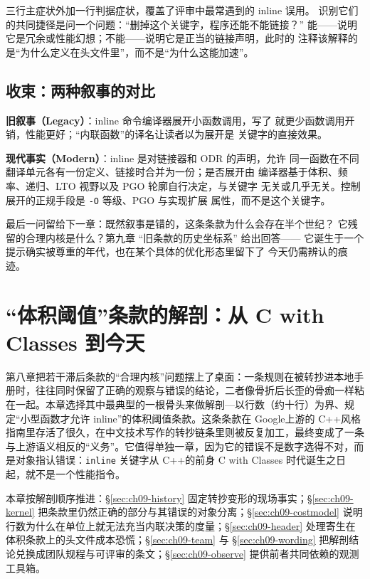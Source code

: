 \documentclass[12pt,a4paper,fontset=fandol]{ctexbook}
\newcommand{\Tp}[1]{\texttt{#1}}
\newcommand{\Lang}[1]{\textsf{#1}}
\newcommand{\CPP}{\Lang{C++}}
\newcommand{\DomGo}{\Lang{Google}}
\newcommand{\DomMod}{\Lang{Modern}}
\newcommand{\DomTra}{\Lang{Legacy}}
\begin{document}
三行主症状外加一行判据症状，覆盖了评审中最常遇到的 inline 误用。
识别它们的共同捷径是问一个问题：``删掉这个关键字，程序还能不能链接？''
能——说明它是冗余或性能幻想；不能——说明它是正当的链接声明，此时的
注释该解释的是``为什么定义在头文件里''，而不是``为什么这能加速''。

\section{收束：两种叙事的对比}
\label{sec:ch08-close}

\begin{compare}[title={``inline 是优化指令''与``inline 是链接语义标记''}]
\textbf{旧叙事（\DomTra）}：inline 命令编译器展开小函数调用，写了
就更少函数调用开销，性能更好；``内联函数''的译名让读者以为展开是
关键字的直接效果。

\textbf{现代事实（\DomMod）}：inline 是对链接器和 ODR 的声明，允许
同一函数在不同翻译单元各有一份定义、链接时合并为一份；是否展开由
编译器基于体积、频率、递归、LTO 视野以及 PGO 轮廓自行决定，与关键字
无关或几乎无关。控制展开的正规手段是 \Tp{-O} 等级、PGO 与实现扩展
属性，而不是这个关键字。
\end{compare}

最后一问留给下一章：既然叙事是错的，这条条款为什么会存在半个世纪？
它残留的合理内核是什么？第九章 ``旧条款的历史坐标系'' 给出回答——
它诞生于一个提示确实被尊重的年代，也在某个具体的优化形态里留下了
今天仍需辨认的痕迹。


\chapter{``体积阈值''条款的解剖：从 C with Classes 到今天}
\label{ch:ch09-threshold}

第八章把若干滞后条款的``合理内核''问题摆上了桌面：一条规则在被转抄进本地手册时，往往同时保留了正确的观察与错误的结论，二者像骨折后长歪的骨痂一样粘在一起。本章选择其中最典型的一根骨头来做解剖---以行数（约十行）为界、规定``小型函数才允许 inline''的体积阈值条款。这条条款在 \DomGo 上游的 \CPP 风格指南里存活了很久，在中文技术写作的转抄链条里则被反复加工，最终变成了一条与上游语义相反的``义务''。它值得单独一章，因为它的错误不是数字选得不对，而是对象指认错误：\Tp{inline} 关键字从 \CPP 的前身 C with Classes 时代诞生之日起，就不是一个性能指令。

本章按解剖顺序推进：\S\ref{sec:ch09-history} 固定转抄变形的现场事实；\S\ref{sec:ch09-kernel} 把条款里仍然正确的部分与其错误的对象分离；\S\ref{sec:ch09-costmodel} 说明行数为什么在单位上就无法充当内联决策的度量；\S\ref{sec:ch09-header} 处理寄生在体积条款上的头文件成本恐慌；\S\ref{sec:ch09-team} 与 \S\ref{sec:ch09-wording} 把解剖结论兑换成团队规程与可评审的条文；\S\ref{sec:ch09-observe} 提供前者共同依赖的观测工具箱。
\end{document}
